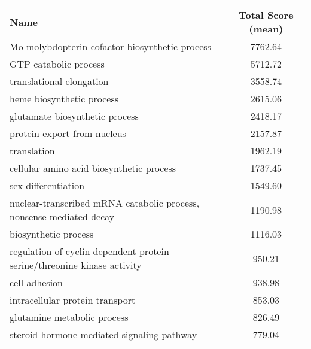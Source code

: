 \begin{table}[h]
\begin{center} \sf
\begin{tabular}{@{}lc@{}}
\toprule
\textbf{Name}                                                           & \textbf{Total Score (mean)} \\ \midrule
Mo-molybdopterin cofactor biosynthetic process                          & 7762.64                     \\
GTP catabolic process                                                   & 5712.72                     \\
translational elongation                                                & 3558.74                     \\
heme biosynthetic process                                               & 2615.06                     \\
glutamate biosynthetic process                                          & 2418.17                     \\
protein export from nucleus                                             & 2157.87                     \\
translation                                                             & 1962.19                     \\
cellular amino acid biosynthetic process                                & 1737.45                     \\
sex differentiation                                                     & 1549.60                     \\
nuclear-transcribed mRNA catabolic process, nonsense-mediated decay     & 1190.98                     \\
biosynthetic process                                                    & 1116.03                     \\
regulation of cyclin-dependent protein serine/threonine kinase activity & 950.21                      \\
cell adhesion                                                           & 938.98                      \\
intracellular protein transport                                         & 853.03                      \\
glutamine metabolic process                                             & 826.49                      \\
steroid hormone mediated signaling pathway                              & 779.04                      \\

\end{tabular}
\end{center}
\end{table}

